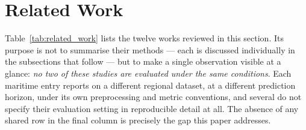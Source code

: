 \documentclass[12pt, a4paper]{article}
\begin{document}
  \section{Related Work}
  \label{sec:related}

  Table~\ref{tab:related_work} lists the twelve works reviewed in this section.
  Its purpose is not to summarise their methods — each is discussed individually
  in the subsections that follow — but to make a single observation visible at a
  glance: \emph{no two of these studies are evaluated under the same conditions}.
  Each maritime entry reports on a different regional dataset, at a different
  prediction horizon, under its own preprocessing and metric conventions, and
  several do not specify their evaluation setting in reproducible detail at all.
  The absence of any shared row in the final column is precisely the gap this
  paper addresses.
\end{document}
